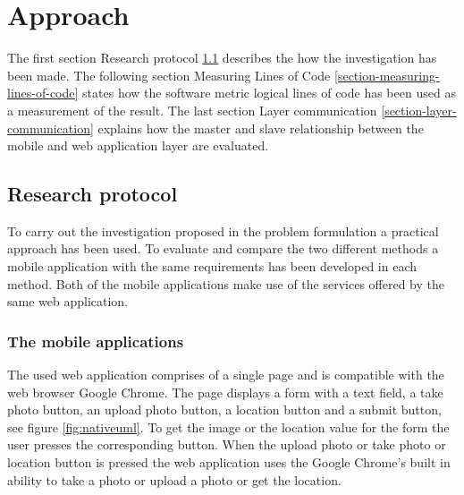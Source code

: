 \chapter{Approach}
The first section Research protocol \ref{section-research-protocol} describes the how the investigation has been made. The following section Measuring Lines of Code \ref{section-measuring-lines-of-code} states how the software metric logical lines of code has been used as a measurement of the result. The last section Layer communication \ref{section-layer-communication} explains how the master and slave relationship between the mobile and web application layer are evaluated. 


\section{Research protocol} \label{section-research-protocol}

To carry out the investigation proposed in the problem formulation a practical approach has been used. To evaluate and compare the two different methods a mobile application with the same requirements has been developed in each method. Both of the mobile applications make use of the services offered by the same web application.

\subsection{The mobile applications}
The used web application comprises of a single page and is compatible with the web browser Google Chrome. The page displays a form with a text field, a take photo button, an upload photo button, a location button and a submit button, see figure \ref{fig:nativeuml}. To get the image or the location value for the form the user presses the corresponding button. When the upload photo or take photo or location button is pressed the web application uses the Google Chrome’s built in ability to take a photo or upload a photo or get the location.

